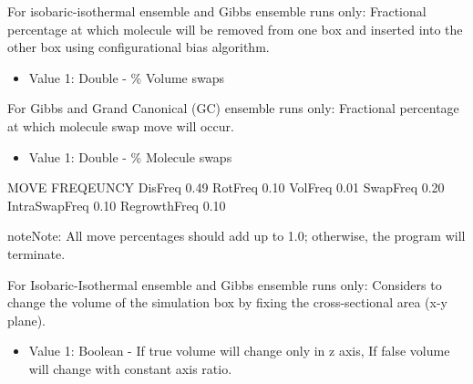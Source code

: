 \documentclass[letterpaper,10pt,english]{sphinxmanual}
\begin{document}
\begin{description}
\begin{itemize}
\end{itemize}

\item[{\sphinxcode{\sphinxupquote{VolFreq}}}] \leavevmode
For isobaric-isothermal ensemble and Gibbs ensemble runs only: Fractional percentage at which molecule will be removed from one box and inserted into the other box using configurational bias algorithm.
\begin{itemize}
\item {} 
Value 1: Double - \% Volume swaps

\end{itemize}

\item[{\sphinxcode{\sphinxupquote{SwapFreq}}}] \leavevmode
For Gibbs and Grand Canonical (GC) ensemble runs only: Fractional percentage at which molecule swap move will occur.
\begin{itemize}
\item {} 
Value 1: Double - \% Molecule swaps

\end{itemize}

%
\begin{sphinxVerbatim}[commandchars=\\\{\}]
\PYGZsh{}\PYGZsh{}\PYGZsh{}\PYGZsh{}\PYGZsh{}\PYGZsh{}\PYGZsh{}\PYGZsh{}\PYGZsh{}\PYGZsh{}\PYGZsh{}\PYGZsh{}\PYGZsh{}\PYGZsh{}\PYGZsh{}\PYGZsh{}\PYGZsh{}\PYGZsh{}\PYGZsh{}\PYGZsh{}\PYGZsh{}\PYGZsh{}\PYGZsh{}\PYGZsh{}\PYGZsh{}\PYGZsh{}\PYGZsh{}\PYGZsh{}\PYGZsh{}\PYGZsh{}\PYGZsh{}\PYGZsh{}\PYGZsh{}
\PYGZsh{} MOVE FREQEUNCY
\PYGZsh{}\PYGZsh{}\PYGZsh{}\PYGZsh{}\PYGZsh{}\PYGZsh{}\PYGZsh{}\PYGZsh{}\PYGZsh{}\PYGZsh{}\PYGZsh{}\PYGZsh{}\PYGZsh{}\PYGZsh{}\PYGZsh{}\PYGZsh{}\PYGZsh{}\PYGZsh{}\PYGZsh{}\PYGZsh{}\PYGZsh{}\PYGZsh{}\PYGZsh{}\PYGZsh{}\PYGZsh{}\PYGZsh{}\PYGZsh{}\PYGZsh{}\PYGZsh{}\PYGZsh{}\PYGZsh{}\PYGZsh{}\PYGZsh{}
DisFreq 0.49
RotFreq 0.10
VolFreq 0.01
SwapFreq 0.20
IntraSwapFreq 0.10
RegrowthFreq 0.10
\end{sphinxVerbatim}

\begin{sphinxadmonition}{note}{Note:}
All move percentages should add up to 1.0; otherwise, the program will terminate.
\end{sphinxadmonition}

\item[{\sphinxcode{\sphinxupquote{useConstantArea}}}] \leavevmode
For Isobaric-Isothermal ensemble and Gibbs ensemble runs only: Considers to change the volume of the simulation box by fixing the cross-sectional area (x-y plane).
\begin{itemize}
\item {} 
Value 1: Boolean - If true volume will change only in z axis, If false volume will change with constant axis ratio.


\end{itemize}
\end{description}
\end{document}
